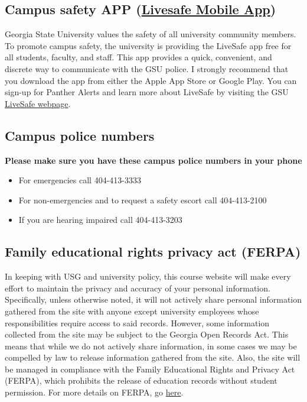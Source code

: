 \documentclass{article}
\begin{document}
\subsection{Campus safety APP (\href{https://safety.gsu.edu/livesafe/}{Livesafe Mobile App})}
Georgia State University values the safety of all university community members.  To promote campus safety, the university is providing the LiveSafe app free for all students, faculty, and staff.  This app provides a quick, convenient, and discrete way to communicate with the GSU police.  I strongly recommend that you download the app from either the Apple App Store or Google Play.  You can sign-up for Panther Alerts and learn more about LiveSafe by visiting the GSU \href{https://safety.gsu.edu/livesafe/}{LiveSafe webpage}.

\subsection{Campus police numbers}
\textbf{Please make sure you have these campus police numbers in your phone}
\begin{itemize}
  \item For emergencies call 404-413-3333
  \item For non-emergencies and to request a safety escort call 404-413-2100 
  \item If you are hearing impaired call 404-413-3203
\end{itemize}

\subsection{Family educational rights privacy act (FERPA)}
In keeping with USG and university policy, this course website will make every effort to maintain the privacy and accuracy of your personal information. Specifically, unless otherwise noted, it will not actively share personal information gathered from the site with anyone except university employees whose responsibilities require access to said records. However, some information collected from the site may be subject to the Georgia Open Records Act. This means that while we do not actively share information, in some cases we may be compelled by law to release information gathered from the site. Also, the site will be managed in compliance with the Family Educational Rights and Privacy Act (FERPA), which prohibits the release of education records without student permission.  For more details on FERPA, go \href{https://registrar.gsu.edu/academic-records/records-access/#ferpa}{here}.
\end{document}
